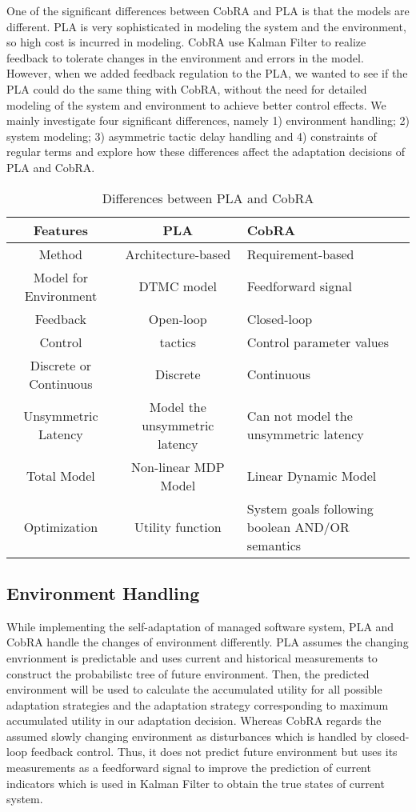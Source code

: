 \documentclass[sigconf]{acmart}
\begin{document}
	One of the significant differences between CobRA and PLA is that the models are different. PLA is very sophisticated in modeling the system and the environment, so high cost is incurred in modeling. CobRA use Kalman Filter to realize feedback to tolerate changes in the environment and errors in the model. However, when we added feedback regulation to the PLA, we wanted to see if the PLA could do the same thing with CobRA, without the need for detailed modeling of the system and environment to achieve better control effects.
	We mainly investigate four significant differences, namely 1) environment handling; 2) system modeling; 3) asymmetric tactic delay handling and 4) constraints of regular terms and explore how these differences affect the adaptation decisions of PLA and CobRA.
	\begin{table*}
		\caption{Differences between PLA and CobRA}
		\label{tab:differences}
		\begin{tabular}{ccl}
			\toprule
			Features&PLA&CobRA\\
			\midrule
			Method & Architecture-based& Requirement-based\\
			Model for Environment & DTMC model
			& Feedforward signal 
			\\
			Feedback & Open-loop
			& Closed-loop\\
			Control  & tactics& Control parameter values
			\\
			Discrete or Continuous&Discrete&Continuous\\
			Unsymmetric Latency&Model the unsymmetric latency&Can not model the unsymmetric latency
			\\
			Total Model&Non-linear MDP Model&Linear Dynamic Model\\
			Optimization&Utility function&System goals following boolean AND/OR semantics\\
			
			\bottomrule
		\end{tabular}
	\end{table*}
	
	\subsection{Environment Handling}
	While implementing the self-adaptation of managed software system, PLA and CobRA handle the changes of environment differently. PLA assumes the changing envrionment is predictable and uses current and historical measurements to construct the probabilistc tree of future environment. Then, the predicted environment will be used to calculate the accumulated utility for all possible adaptation strategies and the adaptation strategy corresponding to maximum accumulated utility in our adaptation decision. Whereas CobRA regards the assumed slowly changing environment as disturbances which is handled by closed-loop feedback control. Thus, it does not predict future environment but uses its measurements as a feedforward signal to improve the prediction of current indicators which is used in Kalman Filter to obtain the true states of current system. 
	
\end{document}
